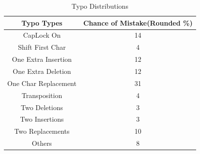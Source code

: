 \begin{table}[h]
	\begin{tabular}{|c|c|}
		\hline
		Typo Types           & Chance of Mistake(Rounded \%) \\ \hline
		CapLock On           & 14                            \\ \hline
		Shift First Char     & 4                             \\ \hline
		One Extra Insertion  & 12                            \\ \hline
		One Extra Deletion   & 12                            \\ \hline
		One Char Replacement & 31                            \\ \hline
		Transposition        & 4                             \\ \hline
		Two Deletions         & 3                             \\ \hline
		Two Insertions        & 3                             \\ \hline
		Two Replacements      & 10                            \\ \hline
		Others               & 8                             \\ \hline
	\end{tabular}
	\caption{Typo Distributions\cite{CCS:CWPCR17}}
	\label{Table:TypoTypes}
	\vspace{-1cm}
\end{table}	


